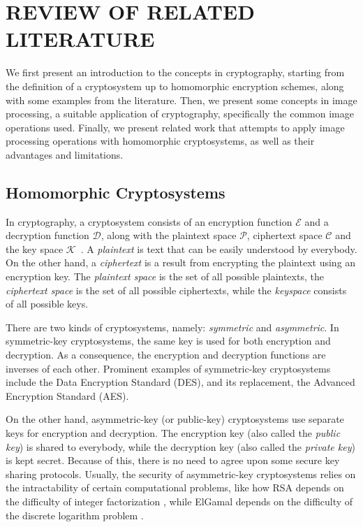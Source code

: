 \chapter{REVIEW OF RELATED LITERATURE}

We first present an introduction to the concepts in cryptography, starting from the definition of a cryptosystem up to homomorphic encryption schemes, along with some examples from the literature. Then, we present some concepts in image processing, a suitable application of cryptography, specifically the common image operations used. Finally, we present related work that attempts to apply image processing operations with homomorphic cryptosystems, as well as their advantages and limitations.

\section{Homomorphic Cryptosystems}

In cryptography, a cryptosystem consists of an encryption function $\mathcal{E}$ and a decryption function $\mathcal{D}$, along with the plaintext space $\mathcal{P}$, ciphertext space $\mathcal{C}$ and the key space $\mathcal{K}$~\cite{bauer_cryptosystem_2005}. A \textit{plaintext} is text that can be easily understood by everybody. On the other hand, a \textit{ciphertext} is a result from encrypting the plaintext using an encryption key. The \textit{plaintext space} is the set of all possible plaintexts, the \textit{ciphertext space} is the set of all possible ciphertexts, while the \textit{keyspace} consists of all possible keys.

There are two kinds of cryptosystems, namely: \textit{symmetric} and \textit{asymmetric}. In symmetric-key cryptosystems, the same key is used for both encryption and decryption. As a consequence, the encryption and decryption functions are inverses of each other. Prominent examples of symmetric-key cryptosystems include the Data Encryption Standard (DES), and its replacement, the Advanced Encryption Standard (AES).

On the other hand, asymmetric-key (or public-key) cryptosystems use separate keys for encryption and decryption. The encryption key (also called the \textit{public key}) is shared to everybody, while the decryption key (also called the \textit{private key}) is kept secret. Because of this, there is no need to agree upon some secure key sharing protocols. Usually, the security of asymmetric-key cryptosystems relies on the intractability of certain computational problems, like how RSA depends on the difficulty of integer factorization \cite{rivest_method_1978}, while ElGamal depends on the difficulty of the discrete logarithm problem \cite{blakley_public_1985}.

